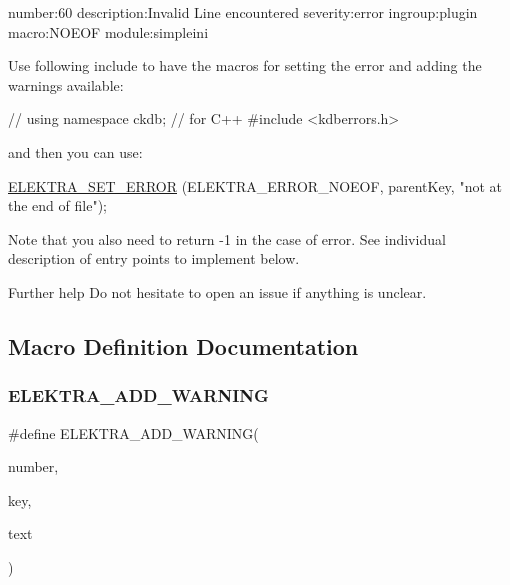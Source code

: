 \begin{DoxyCodeInclude}
number:60
description:Invalid Line encountered
severity:error
ingroup:plugin
macro:NOEOF
module:simpleini
\end{DoxyCodeInclude}
 Use following include to have the macros for setting the error and adding the warnings available\+:


\begin{DoxyCodeInclude}
\textcolor{comment}{// using namespace ckdb; // for C++}
\textcolor{preprocessor}{#include <kdberrors.h>}
\end{DoxyCodeInclude}
 and then you can use\+:


\begin{DoxyCodeInclude}
\hyperlink{group__plugin_gaab1842b82272e6d4235b6a71587a64d9}{ELEKTRA\_SET\_ERROR} (ELEKTRA\_ERROR\_NOEOF, parentKey, \textcolor{stringliteral}{"not at the end of file"});
\end{DoxyCodeInclude}
 Note that you also need to return -\/1 in the case of error. See individual description of entry points to implement below.

\begin{DoxyParagraph}{Further help}
Do not hesitate to open an issue if anything is unclear. 
\end{DoxyParagraph}


\subsection{Macro Definition Documentation}
\mbox{\label{group__plugin_ga3da3bdb0f41710adda9eee3d7adac9ff}} 
\subsubsection{\texorpdfstring{E\+L\+E\+K\+T\+R\+A\+\_\+\+A\+D\+D\+\_\+\+W\+A\+R\+N\+I\+NG}{ELEKTRA\_ADD\_WARNING}}
{\footnotesize\ttfamily \#define E\+L\+E\+K\+T\+R\+A\+\_\+\+A\+D\+D\+\_\+\+W\+A\+R\+N\+I\+NG(\begin{DoxyParamCaption}\item[{}]{number,  }\item[{}]{key,  }\item[{}]{text }\end{DoxyParamCaption})}



